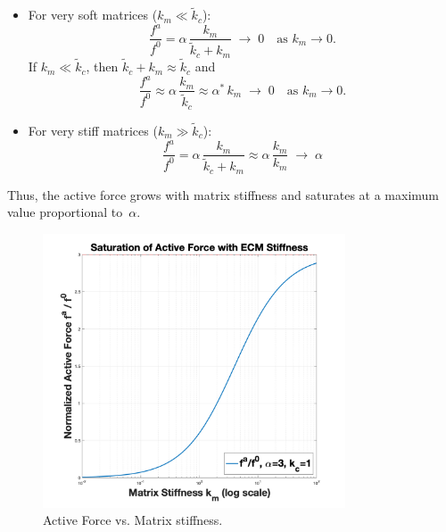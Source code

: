 \documentclass[a4paper,margin=1in]{article}
\begin{document}
\begin{itemize}
  \item For very soft matrices (\(k_{m}\ll \tilde{k}_{c}\)):
    \[
      \frac{f^{a}}{f^{0}}
      = \alpha \,\frac{k_{m}}{\tilde{k}_{c} + k_{m}}
      \;\longrightarrow\;0
      \quad\text{as }k_{m}\to 0.
    \]
    If \(k_{m}\ll \tilde{k}_{c}\), then \(\tilde{k}_{c}+k_{m}\approx \tilde{k}_{c}\) and
    \[
      \frac{f^{a}}{f^{0}}
      \approx \alpha \,\frac{k_{m}}{\tilde{k}_{c}}
       \approx   \alpha^{*}  \,k_{m}
      \;\longrightarrow\;0
      \quad\text{as }k_{m}\to 0.
    \]
  \item For very stiff matrices (\(k_{m}\gg \tilde{k}_{c}\)):
    \[
      \frac{f^{a}}{f^{0}}
      = \alpha \,\frac{k_{m}}{\tilde{k}_{c} + k_{m}}
      \approx \alpha \,\frac{k_{m}}{k_{m}} 
      \;\longrightarrow\;\alpha
    \] 
\end{itemize}

Thus, the active force grows with matrix stiffness and  
saturates at a maximum value proportional to~$\alpha$.

\begin{figure}[H]
  \centering
  \includegraphics[width=0.8\textwidth]{plot}
  \caption{Active Force vs. Matrix stiffness.}
  \label{fig:activeForcet}
\end{figure}
     


\end{document}
